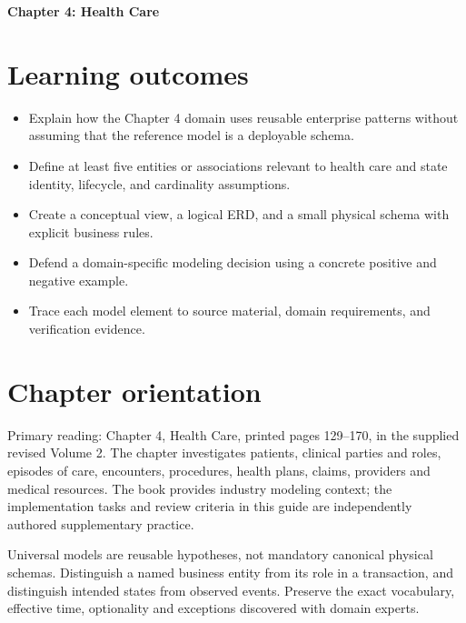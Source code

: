 \documentclass[11pt,letterpaper]{article}
\begin{document}
\begin{center}
{\LARGE\bfseries\color{navy} Chapter 4: Health Care}\par
\vspace{0.25em}{\large Study guide | concept, critique, design, verify}\par
{}
\end{center}
\vspace{0.8em}
\section{Learning outcomes}
\begin{itemize}
\item Explain how the Chapter 4 domain uses reusable enterprise patterns without assuming that the reference model is a deployable schema.
\item Define at least five entities or associations relevant to health care and state identity, lifecycle, and cardinality assumptions.
\item Create a conceptual view, a logical ERD, and a small physical schema with explicit business rules.
\item Defend a domain-specific modeling decision using a concrete positive and negative example.
\item Trace each model element to source material, domain requirements, and verification evidence.
\end{itemize}

\section{Chapter orientation}
Primary reading: Chapter 4, Health Care, printed pages 129--170, in the supplied revised Volume 2. The chapter investigates patients, clinical parties and roles, episodes of care, encounters, procedures, health plans, claims, providers and medical resources. The book provides industry modeling context; the implementation tasks and review criteria in this guide are independently authored supplementary practice.

Universal models are reusable hypotheses, not mandatory canonical physical schemas. Distinguish a named business entity from its role in a transaction, and distinguish intended states from observed events. Preserve the exact vocabulary, effective time, optionality and exceptions discovered with domain experts.
\end{document}
